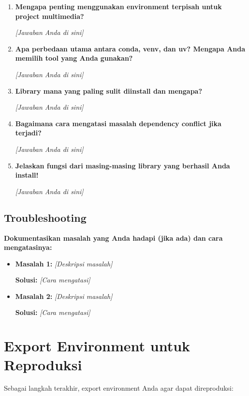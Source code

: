 \documentclass[11pt,a4paper]{article}
\begin{document}
\begin{enumerate}
    \item \textbf{Mengapa penting menggunakan environment terpisah untuk project multimedia?}
    
    \textit{[Jawaban Anda di sini]}
    
    \item \textbf{Apa perbedaan utama antara conda, venv, dan uv? Mengapa Anda memilih tool yang Anda gunakan?}
    
    \textit{[Jawaban Anda di sini]}
    
    \item \textbf{Library mana yang paling sulit diinstall dan mengapa?}
    
    \textit{[Jawaban Anda di sini]}
    
    \item \textbf{Bagaimana cara mengatasi masalah dependency conflict jika terjadi?}
    
    \textit{[Jawaban Anda di sini]}
    
    \item \textbf{Jelaskan fungsi dari masing-masing library yang berhasil Anda install!}
    
    \textit{[Jawaban Anda di sini]}
\end{enumerate}

\subsection{Troubleshooting}
\textbf{Dokumentasikan masalah yang Anda hadapi (jika ada) dan cara mengatasinya:}

\begin{itemize}
    \item \textbf{Masalah 1:} \textit{[Deskripsi masalah]}
    
    \textbf{Solusi:} \textit{[Cara mengatasi]}
    
    \item \textbf{Masalah 2:} \textit{[Deskripsi masalah]}
    
    \textbf{Solusi:} \textit{[Cara mengatasi]}
\end{itemize}

\section{Export Environment untuk Reproduksi}
Sebagai langkah terakhir, export environment Anda agar dapat direproduksi:
\end{document}
